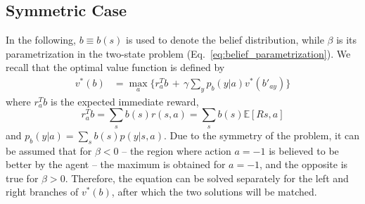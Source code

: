 \documentclass[aps,nofootinbib,groupaddress,superscriptaddress,reprint,amsmath,amssymb,graphicx,onecolumn,prx]{revtex4-2}
\begin{document}
\subsection*{Symmetric Case}
\noindent In the following, $b\equiv b(s)$ is used to denote the belief distribution, while $\beta$ is its parametrization in the two-state problem (Eq.~\eqref{eq:belief_parametrization}). We recall that the optimal value function is defined by
\begin{align}
    v^*(b)&=\max_a\Biggl\{r_a^Tb\,+\,\gamma  \sum_yp_b(y|a)v^*(b'_{ay})\Biggr\}
\end{align}
where $r_a^Tb$ is the expected immediate reward,
\begin{equation}
    r_a^Tb=\sum_s b(s)r(s,a)=\sum_s b(s)\mathbb{E}[R{s,a}]
\end{equation}
and $p_b(y|a)=\sum_sb(s)p(y|s,a)$. Due to the symmetry of the problem, it can be assumed that for $\beta<0$ -- the region where action $a = -1$ is believed to be better by the agent -- the maximum is obtained for $a=-1$, and the opposite is true for $\beta>0$. Therefore, the equation can be solved separately for the left and right branches of $v^*(b)$, after which the two solutions will be matched.
\end{document}
